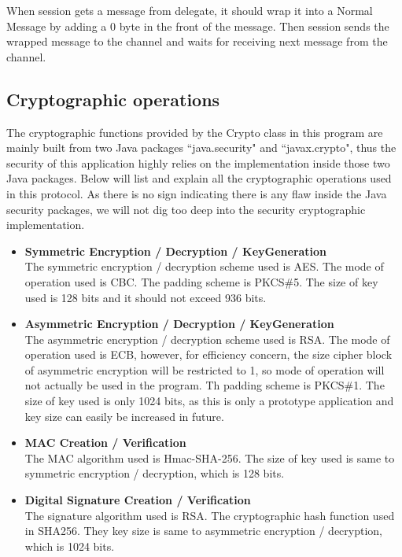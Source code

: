 When session gets a message from delegate, it should wrap it into a Normal Message by adding a 0 byte in the front of the message. Then session sends the wrapped message to the channel and waits for receiving next message from the channel.

\subsection{Cryptographic operations}
The cryptographic functions provided by the Crypto class in this program are mainly built from two Java packages ``java.security" and ``javax.crypto", thus the security of this application highly relies on the implementation inside those two Java packages. Below will list and explain all the cryptographic operations used in this protocol. As there is no sign indicating there is any flaw inside the Java security packages, we will not dig too deep into the security cryptographic implementation. 

\begin{itemize}
\item \textbf{Symmetric Encryption / Decryption / KeyGeneration} \\
The symmetric encryption / decryption scheme used is AES. The mode of operation used is CBC. The padding scheme is PKCS\#5. The size of key used is 128 bits and it should not exceed 936 bits.

\item \textbf{Asymmetric Encryption / Decryption / KeyGeneration} \\
The asymmetric encryption / decryption scheme used is RSA. The mode of operation used is ECB, however, for efficiency concern, the size cipher block of asymmetric encryption will be restricted to 1, so mode of operation will not actually be used in the program. Th padding scheme is PKCS\#1. The size of key used is only 1024 bits, as this is only a prototype application and key size can easily be increased in future.

\item \textbf{MAC Creation / Verification} \\
The MAC algorithm used is Hmac-SHA-256. The size of key used is same to symmetric encryption / decryption, which is 128 bits.

\item \textbf{Digital Signature Creation / Verification} \\
The signature algorithm used is RSA. The cryptographic hash function used in SHA256. They key size is same to asymmetric encryption / decryption, which is 1024 bits.
\end{itemize}

